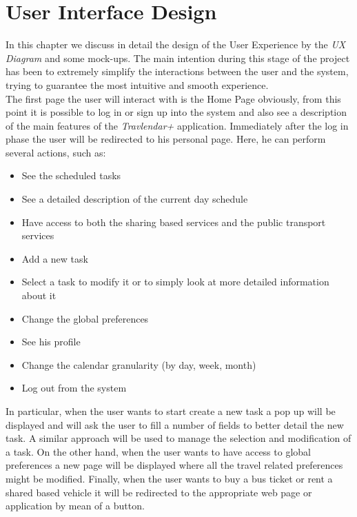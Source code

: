 \chapter{User Interface Design}
In this chapter we discuss in detail the design of the User Experience by the \emph{UX Diagram} and some mock-ups. The main intention during this stage of the project has been to extremely simplify the interactions between the user and the system, trying to guarantee the most intuitive and smooth experience. 
\\The first page the user will interact with is the Home Page obviously, from this point it is possible to log in or sign up into the system and also see a description of the main features of the \emph{Travlendar+} application.
Immediately after the log in phase the user will be redirected to his personal page. Here, he can perform several actions, such as: 
\begin{itemize}
    \item See the scheduled tasks
    \item See a detailed description of the current day schedule
    \item Have access to both the sharing based services and the public transport services 
    \item Add a new task
    \item Select a task to modify it or to simply look at more detailed information about it
    \item Change the global preferences
    \item See his profile
    \item Change the calendar granularity (by day, week, month)
    \item Log out from the system 
\end{itemize}  
In particular, when the user wants to start create a new task a pop up will be displayed and will ask the user to fill a number of fields to better detail the new task. A similar approach will be used to manage the selection and modification of a task.
On the other hand, when the user wants to have access to global preferences a new page will be displayed where all the travel related preferences might be modified. 
Finally, when the user wants to buy a bus ticket or rent a shared based vehicle it will be redirected to the appropriate web page or application by mean of a button. 

